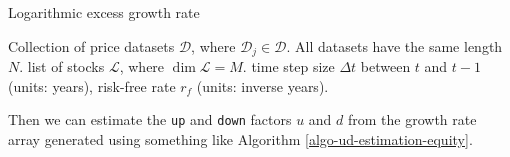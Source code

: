 \documentclass[11pt]{article}
\theoremstyle{definition}
\begin{document}
\begin{algorithm}[h]
    \caption{Logarithmic excess growth rate}\label{algo-log-return-distributions-equity}
    \begin{algorithmic}[1]
        
        \Require Collection of price datasets $\mathcal{D}$, where $\mathcal{D}_{j}\in\mathcal{D}$. All datasets have the same length $N$.	
		\Require list of stocks $\mathcal{L}$, where $\dim\mathcal{L} = M$.
        \Require time step size $\Delta{t}$ between $t$ and $t-1$ (units: years), 
        \Require risk-free rate $r_{f}$ (units: inverse years).

		\Statex
     
        \Statex

                
            \EndFor
        \EndFor
	
    \end{algorithmic}
\end{algorithm}
Then we can estimate the \texttt{up} and \texttt{down} factors $u$ and $d$ from the growth rate array 
generated using something like Algorithm \ref{algo-ud-estimation-equity}. 
\end{document}
